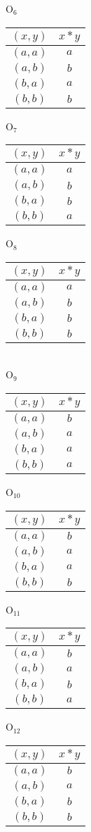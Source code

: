 \documentclass[10pt]{article}
\begin{document}
\quad
O$_{6}$\begin{tabular}{c|c}
$(x,y)$ & $x * y$ \\
\hline
$(a,a)$ & $a$ \\
$(a,b)$ & $b$ \\
$(b,a)$ & $a$ \\
$(b,b)$ & $b$
\end{tabular}
\quad
O$_{7}$\begin{tabular}{c|c}
$(x,y)$ & $x * y$ \\
\hline
$(a,a)$ & $a$ \\
$(a,b)$ & $b$ \\
$(b,a)$ & $b$ \\
$(b,b)$ & $a$
\end{tabular}
\quad
O$_{8}$\begin{tabular}{c|c}
$(x,y)$ & $x * y$ \\
\hline
$(a,a)$ & $a$ \\
$(a,b)$ & $b$ \\
$(b,a)$ & $b$ \\
$(b,b)$ & $b$
\end{tabular}
\\O$_{9}$\begin{tabular}{c|c}
$(x,y)$ & $x * y$ \\
\hline
$(a,a)$ & $b$ \\
$(a,b)$ & $a$ \\
$(b,a)$ & $a$ \\
$(b,b)$ & $a$
\end{tabular}
\quad
O$_{10}$\begin{tabular}{c|c}
$(x,y)$ & $x * y$ \\
\hline
$(a,a)$ & $b$ \\
$(a,b)$ & $a$ \\
$(b,a)$ & $a$ \\
$(b,b)$ & $b$
\end{tabular}
\quad
O$_{11}$\begin{tabular}{c|c}
$(x,y)$ & $x * y$ \\
\hline
$(a,a)$ & $b$ \\
$(a,b)$ & $a$ \\
$(b,a)$ & $b$ \\
$(b,b)$ & $a$
\end{tabular}
\quad
O$_{12}$\begin{tabular}{c|c}
$(x,y)$ & $x * y$ \\
\hline
$(a,a)$ & $b$ \\
$(a,b)$ & $a$ \\
$(b,a)$ & $b$ \\
$(b,b)$ & $b$
\end{tabular}
\end{document}
